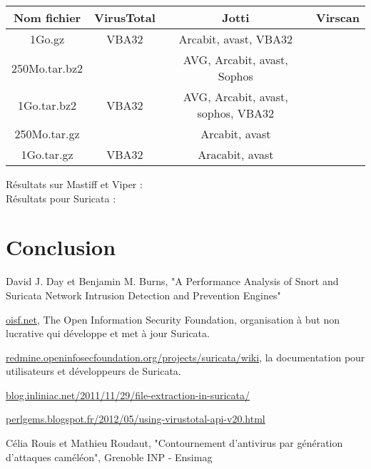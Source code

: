 \documentclass[smallextended]{svjour3}       %
\begin{document}
$ $\\
\begin{tabular}{|c|c|c|c|}
    \hline
     Nom fichier & VirusTotal & Jotti & Virscan \\
    \hline
    1Go.gz & VBA32 & Arcabit, avast, VBA32 & \\
    \hline
    250Mo.tar.bz2 & & AVG, Arcabit, avast, Sophos & \\
    \hline
    1Go.tar.bz2 & VBA32 & AVG, Arcabit, avast, sophos, VBA32 & \\
    \hline
    250Mo.tar.gz & & Arcabit, avast & \\
    \hline
    1Go.tar.gz & VBA32 & Aracabit, avast & \\
    \hline
\end{tabular}
$ $\\
Résultats sur Mastiff et Viper :\\
$ $\\
Résultats pour Suricata :\\

\section{Conclusion}
\label{2.3ids}

\begin{thebibliography}{}
%

David J. Day et Benjamin M. Burns, "A Performance Analysis of Snort and Suricata Network Intrusion Detection and Prevention Engines"

\url{oisf.net}, The Open Information Security Foundation, organisation à but non lucrative qui développe et met à jour Suricata.

\url{redmine.openinfosecfoundation.org/projects/suricata/wiki}, la documentation pour utilisateurs et développeurs de Suricata.

\url{blog.inliniac.net/2011/11/29/file-extraction-in-suricata/}

\url{perlgems.blogspot.fr/2012/05/using-virustotal-api-v20.html}

Célia Rouis et Mathieu Roudaut, "Contournement d'antivirus par génération d'attaques caméléon", Grenoble INP - Ensimag


\end{thebibliography}
\end{document}
